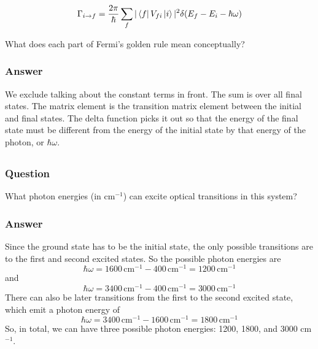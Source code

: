 \documentclass[12pt]{article}
\begin{document}
\[
\Gamma_{i \rightarrow f} = \frac{2\pi}{\hbar} \sum_{f} |\bra{f}V_{fi}\ket{i}|^{2}\delta(E_f - E_i - \hbar\omega)
\]

What does each part of Fermi’s golden rule mean conceptually?
\subsubsection{Answer}
We exclude talking about the constant terms in front. The sum is over all final states. The matrix element is the transition matrix element between the initial and final states. The delta function picks it out so that the energy of the final state must be different from the energy of the initial state by that energy of the photon, or $\hbar\omega$.
\subsection{}
\subsubsection{Question}

What photon energies (in cm\(^{-1}\)) can excite optical transitions in this system?
\subsubsection{Answer}
Since the ground state has to be the initial state, the only possible transitions are to the first and second excited states. So the possible photon energies are
    \begin{equation}
        \hbar\omega = 1600 \, \text{cm}^{-1} - 400 \, \text{cm}^{-1} = 1200 \, \text{cm}^{-1}
    \end{equation}
    and
    \begin{equation}
        \hbar\omega = 3400 \, \text{cm}^{-1} - 400 \, \text{cm}^{-1} = 3000 \, \text{cm}^{-1}
    \end{equation}
There can also be later transitions from the first to the second excited state, which emit a photon energy of
\begin{equation}
    \hbar\omega = 3400 \, \text{cm}^{-1} - 1600 \, \text{cm}^{-1} = 1800 \, \text{cm}^{-1}
\end{equation}
So, in total, we can have three possible photon energies: 1200, 1800, and 3000 cm\(^{-1}\).
\subsection{}
\end{document}
